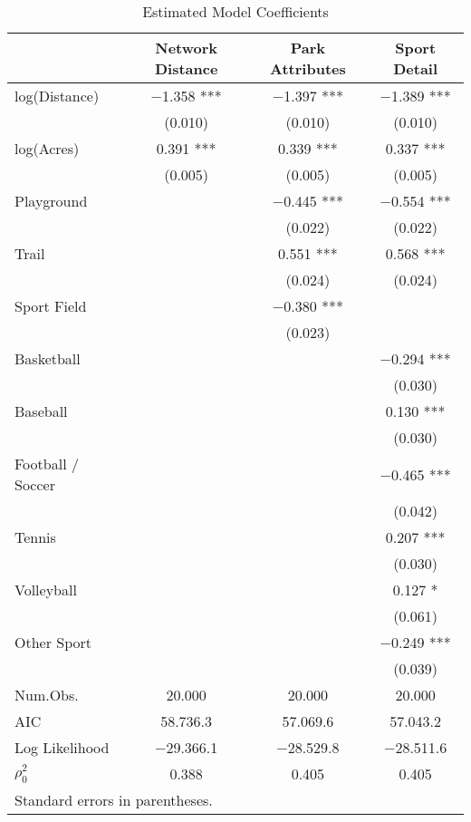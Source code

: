 \documentclass[3p, authoryear, review]{elsarticle} %
\begin{document}
\begin{table}

\caption{\label{tab:base-modelsummary}Estimated Model Coefficients}
\centering
\begin{tabular}[t]{lccc}
\toprule
  & Network Distance & Park Attributes & Sport Detail\\
\midrule
log(Distance) & \num{-1.358} *** & \num{-1.397} *** & \num{-1.389} ***\\
 & (\num{0.010}) & (\num{0.010}) & (\num{0.010})\\
log(Acres) & \num{0.391} *** & \num{0.339} *** & \num{0.337} ***\\
 & (\num{0.005}) & (\num{0.005}) & (\num{0.005})\\
Playground &  & \num{-0.445} *** & \num{-0.554} ***\\
 &  & (\num{0.022}) & (\num{0.022})\\
Trail &  & \num{0.551} *** & \num{0.568} ***\\
 &  & (\num{0.024}) & (\num{0.024})\\
Sport Field &  & \num{-0.380} *** & \\
 &  & (\num{0.023}) & \\
Basketball &  &  & \num{-0.294} ***\\
 &  &  & \vphantom{2} (\num{0.030})\\
Baseball &  &  & \num{0.130} ***\\
 &  &  & \vphantom{1} (\num{0.030})\\
Football / Soccer &  &  & \num{-0.465} ***\\
 &  &  & (\num{0.042})\\
Tennis &  &  & \num{0.207} ***\\
 &  &  & (\num{0.030})\\
Volleyball &  &  & \num{0.127} *\\
 &  &  & (\num{0.061})\\
Other Sport &  &  & \num{-0.249} ***\\
 &  &  & (\num{0.039})\\
\midrule
Num.Obs. & \num{20,000} & \num{20,000} & \num{20,000}\\
AIC & \num{58,736.3} & \num{57,069.6} & \num{57,043.2}\\
Log Likelihood & \num{-29,366.1} & \num{-28,529.8} & \num{-28,511.6}\\
$\rho^2_0$ & \num{0.388} & \num{0.405} & \num{0.405}\\
\bottomrule
\multicolumn{4}{l}{\rule{0pt}{1em}Standard errors in parentheses.}\\
\end{tabular}
\end{table}
\end{document}
